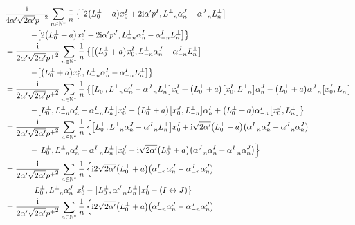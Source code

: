 \begin{align*}
    &\frac{\im}{4\alpha'\sqrt{2\alpha'}{p^+}^2}\sum\limits_{n\in\mathbb N^\ast}\frac1n\left\{\comm{2\qty(L_0^\perp+a)x_0^I+2\im\alpha' p^I}{L^\perp_{-n}\alpha_n^J-\alpha^J_{-n}L^\perp_n}\right.\\
    &\quad\quad\quad\left.-\comm{2\qty(L_0^\perp+a)x_0^J+2\im\alpha' p^J}{L^\perp_{-n}\alpha_n^I-\alpha^I_{-n}L^\perp_n}\right\}\\
    &=\frac{\im}{2\alpha'\sqrt{2\alpha'}{p^+}^2}\sum\limits_{n\in\mathbb N^\ast}\frac1n\left\{\comm{\qty(L_0^\perp+a)x_0^I}{L^\perp_{-n}\alpha_n^J-\alpha^J_{-n}L^\perp_n}\right.\\
    &\quad\quad\quad\left.-\comm{\qty(L_0^\perp+a)x_0^J}{L^\perp_{-n}\alpha_n^I-\alpha^I_{-n}L^\perp_n}\right\}\\
    &=\frac{\im}{2\alpha'\sqrt{2\alpha'}{p^+}^2}\sum\limits_{n\in\mathbb N^\ast}\frac1n\left\{\comm{L_0^\perp}{L^\perp_{-n}\alpha_n^J-\alpha^J_{-n}L^\perp_n}x_0^I+\qty(L_0^\perp+a)\comm{x_0^I}{L^\perp_{-n}}\alpha_n^J-\qty(L_0^\perp+a)\alpha^J_{-n}\comm{x_0^I}{L^\perp_n}\right.\\
    &\quad\quad\quad\left.-\comm{L_0^\perp}{L^\perp_{-n}\alpha_n^I-\alpha^I_{-n}L^\perp_n}x_0^J-\qty(L_0^\perp+a)\comm{x_0^J}{L^\perp_{-n}}\alpha_n^I+\qty(L_0^\perp+a)\alpha^I_{-n}\comm{x_0^J}{L^\perp_n}\right\}\\
    &=\frac{\im}{2\alpha'\sqrt{2\alpha'}{p^+}^2}\sum\limits_{n\in\mathbb N^\ast}\frac1n\left\{\comm{L_0^\perp}{L^\perp_{-n}\alpha_n^J-\alpha^J_{-n}L^\perp_n}x_0^I+\im\sqrt{2\alpha'}\qty(L_0^\perp+a)\qty(\alpha_{-n}^I\alpha_n^J-\alpha^J_{-n}\alpha_n^J)\right.\\
    &\quad\quad\quad\left.-\comm{L_0^\perp}{L^\perp_{-n}\alpha_n^I-\alpha^I_{-n}L^\perp_n}x_0^J-\im \sqrt{2\alpha'}\qty(L_0^\perp+a)\qty(\alpha_{-n}^J\alpha_n^I-\alpha^I_{-n}\alpha_n^J)\right\}\\
    &=\frac{\im}{2\alpha'\sqrt{2\alpha'}{p^+}^2}\sum\limits_{n\in\mathbb N^\ast}\frac1n\left\{\im2\sqrt{2\alpha'}\qty(L_0^\perp+a)\qty(\alpha_{-n}^I\alpha_n^J-\alpha^J_{-n}\alpha_n^J)\right.\\
    &\quad\quad\quad\left.\comm{L_0^\perp}{L^\perp_{-n}\alpha_n^J}x_0^I-\comm{L_0^\perp}{\alpha^J_{-n}L^\perp_n}x_0^I-\qty(I\leftrightarrow J)\right\}\\
    &=\frac{\im}{2\alpha'\sqrt{2\alpha'}{p^+}^2}\sum\limits_{n\in\mathbb N^\ast}\frac1n\left\{\im2\sqrt{2\alpha'}\qty(L_0^\perp+a)\qty(\alpha_{-n}^I\alpha_n^J-\alpha^J_{-n}\alpha_n^J)\right.\\

\end{align*}
